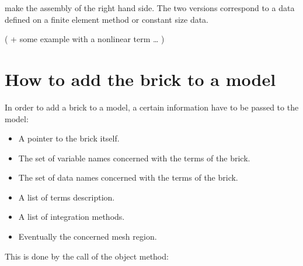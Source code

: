\documentclass[a4paper,11pt,english]{sphinxmanual}
\begin{document}
\begin{sphinxVerbatim}[commandchars=\\\{\}]
 
  \PYG{p}{[}\PYG{p}{]}     
  \PYG{p}{[}\PYG{p}{]}    
\end{sphinxVerbatim}

make the assembly of the right hand side. The two versions correspond to a data
defined on a finite element method or constant size data.

( + some example with a nonlinear term … )


\section{How to add the brick to a model}
\label{\detokenize{userdoc/model_object:how-to-add-the-brick-to-a-model}}
In order to add a brick to a model, a certain information have to be passed to the
model:
\begin{itemize}
\item {} 
A pointer to the brick itself.

\item {} 
The set of variable names concerned with the terms of the brick.

\item {} 
The set of data names concerned with the terms of the brick.

\item {} 
A list of terms description.

\item {} 
A list of integration methods.

\item {} 
Eventually the concerned mesh region.

\end{itemize}

This is done by the call of the  object method:
\end{document}
